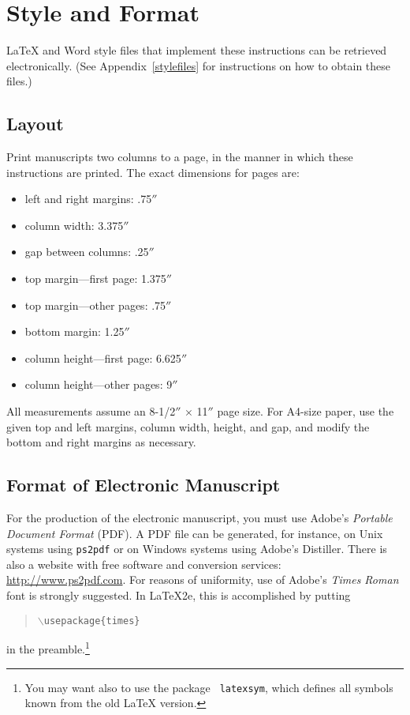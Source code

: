 \documentclass{article}
\begin{document}
\section{Style and Format}

\LaTeX{} and Word style files that implement these instructions
can be retrieved electronically. (See Appendix~\ref{stylefiles} for
instructions on how to obtain these files.)

\subsection{Layout}

Print manuscripts two columns to a page, in the manner in which these
instructions are printed. The exact dimensions for pages are:
\begin{itemize}
\item left and right margins: .75$''$
\item column width: 3.375$''$
\item gap between columns: .25$''$
\item top margin---first page: 1.375$''$
\item top margin---other pages: .75$''$
\item bottom margin: 1.25$''$
\item column height---first page: 6.625$''$
\item column height---other pages: 9$''$
\end{itemize}

All measurements assume an 8-1/2$''$ $\times$ 11$''$ page size. For
A4-size paper, use the given top and left margins, column width,
height, and gap, and modify the bottom and right margins as necessary.

\subsection{Format of Electronic Manuscript}

For the production of the electronic manuscript, you must use Adobe's
{\em Portable Document Format} (PDF). A PDF file can be generated, for
instance, on Unix systems using {\tt ps2pdf} or on Windows systems
using Adobe's Distiller. There is also a website with free software
and conversion services: \url{http://www.ps2pdf.com}. For reasons of
uniformity, use of Adobe's {\em Times Roman} font is strongly suggested. In
\LaTeX2e{}, this is accomplished by putting
\begin{quote} 
\mbox{\tt $\backslash$usepackage\{times\}}
\end{quote}
in the preamble.\footnote{You may want also to use the package {\tt
latexsym}, which defines all symbols known from the old \LaTeX{}
version.}
  
\end{document}
